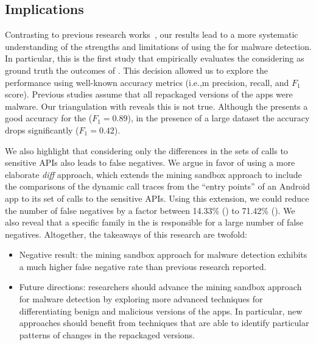 \subsection{Implications}\label{sec:implications} 

Contrasting to previous research works~\cite{DBLP:conf/wcre/BaoLL18,DBLP:conf/iceccs/LeB0GL18,DBLP:journals/jss/CostaMMSSBNR22},
our results 
lead to a more systematic understanding
of the strengths and limitations of using the \mas
for malware detection. In particular, this is the
first study that empirically evaluates the \mas
considering as ground truth the outcomes
of \vt. This decision allowed us to explore the
\mas performance using well-known accuracy metrics (i.e.,m precision, recall, and
$F_1$ score). Previous studies assume that all repackaged versions of the
apps were malware. Our triangulation with \vt reveals this is not true. Although
the \mas presents a good accuracy for the \sds ($F_1 = 0.89$), 
in the presence of a large dataset the \mas accuracy drops significantly ($F_1 = 0.42$). 

We also highlight that considering only the differences in the
sets of calls to sensitive APIs also leads to false negatives. We
argue in favor of using a more elaborate \emph{diff} approach, which
extends the mining sandbox approach to include the comparisons of
the dynamic call traces from the ``entry points'' of an Android app to its
set of calls to the sensitive APIs. Using this extension, we could reduce
the number of false negatives by a factor
between 14.33\% (\cds) to 71.42\% (\sds). We also reveal that
a specific family in the \cds is responsible for a large number of
false negatives. 
Altogether, the takeaways of this research are twofold:

\begin{itemize}
  \item Negative result: the mining sandbox approach for malware detection exhibits a much higher false negative rate than previous research reported. 

  \item Future directions: researchers should advance the mining sandbox approach for malware detection by exploring more advanced
    techniques for differentiating benign and malicious versions of the apps. In particular, new approaches should benefit from techniques
    that are able to identify particular patterns of changes in the repackaged versions. 
\end{itemize}  


